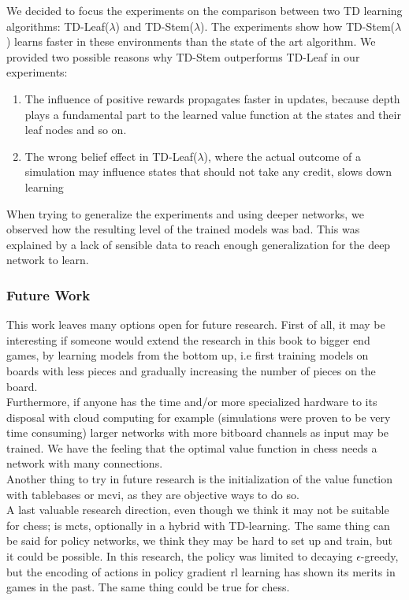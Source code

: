 We decided to focus the experiments on the comparison between two TD learning algorithms: TD-Leaf($\lambda$) and TD-Stem($\lambda$). The experiments show how TD-Stem($\lambda$) learns faster in these environments than the state of the art algorithm. We provided two possible reasons why TD-Stem outperforms TD-Leaf in our experiments:
\begin{enumerate}
\item The influence of positive rewards propagates faster in updates, because depth plays a fundamental part to the learned value function at the states and their leaf nodes and so on.
\item The wrong belief effect in TD-Leaf($\lambda$), where the actual outcome of a simulation may influence states that should not take any credit, slows down learning
\end{enumerate}
When trying to generalize the experiments and using deeper networks, we observed how the resulting level of the trained models was bad. This was explained by a lack of sensible data to reach enough generalization for the deep network to learn.

\subsubsection*{Future Work}
This work leaves many options open for future research. First of all, it may be interesting if someone would extend the research in this book to bigger end games, by learning models from the bottom up, i.e first training models on boards with less pieces and gradually increasing the number of pieces on the board. \\

Furthermore, if anyone has the time and/or more specialized hardware to its disposal with cloud computing for example (simulations were proven to be very time consuming) larger networks with more bitboard channels as input may be trained. We have the feeling that the optimal value function in chess needs a network with many connections.\\
Another thing to try in future research is the initialization of the value function with tablebases or \gls{mcvi}, as they are objective ways to do so.\\

A last valuable research direction, even though we think it may not be suitable for chess; is \gls{mcts}, optionally in a hybrid with TD-learning. The same thing can be said for policy networks, we think they may be hard to set up and train, but it could be possible. In this research, the policy was limited to decaying $\epsilon$-greedy, but the encoding of actions in policy gradient \gls{rl} learning has shown its merits in games in the past. The same thing could be true for chess. 